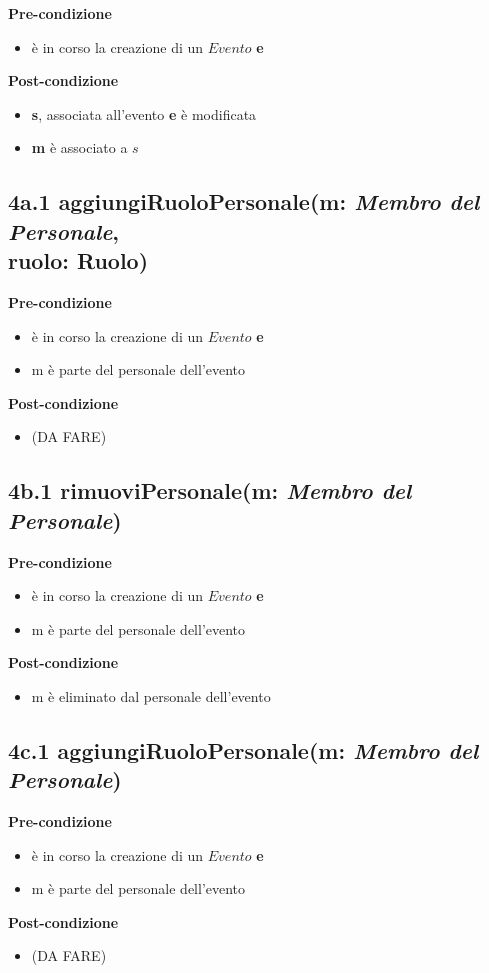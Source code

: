 \documentclass[12pt]{extarticle}
\begin{document}
\textbf{Pre-condizione}
\begin{itemize}
  \item è in corso la creazione di un $Evento$ \textbf{e}
\end{itemize}
\textbf{Post-condizione}
\begin{itemize}
  \item \textbf{s}, associata all'evento \textbf{e} è modificata
  \item \textbf{m} è associato a $s$
\end{itemize}

\subsection*{4a.1 aggiungiRuoloPersonale(m: \textit{Membro del Personale},\\ ruolo: Ruolo)}
\textbf{Pre-condizione}
\begin{itemize}
  \item è in corso la creazione di un $Evento$ \textbf{e}
  \item m è parte del personale dell'evento
\end{itemize}
\textbf{Post-condizione}
\begin{itemize}
  \item (DA FARE)
\end{itemize}

\subsection*{4b.1 rimuoviPersonale(m: \textit{Membro del Personale})}
\textbf{Pre-condizione}
\begin{itemize}
  \item è in corso la creazione di un $Evento$ \textbf{e}
  \item m è parte del personale dell'evento
\end{itemize}
\textbf{Post-condizione}
\begin{itemize}
  \item m è eliminato dal personale dell'evento
\end{itemize}

\subsection*{4c.1 aggiungiRuoloPersonale(m: \textit{Membro del Personale})}
\textbf{Pre-condizione}
\begin{itemize}
  \item è in corso la creazione di un $Evento$ \textbf{e}
  \item m è parte del personale dell'evento
\end{itemize}
\textbf{Post-condizione}
\begin{itemize}
  \item (DA FARE)
\end{itemize}
\end{document}

